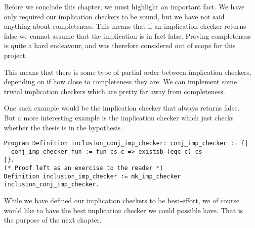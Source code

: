 Before we conclude this chapter, we must highlight an important fact. We have only
required our implication checkers to be sound, but we have not said anything about
completeness. This means that if an implication checker returns false we cannot 
assume that the implication is in fact false. Proving completeness is quite a hard
endeavour, and was therefore considered out of scope for this project.

This means that there is some type of partial order between implication checkers, 
depending on if how close to completeness they are. We can implement some trivial
implication checkers which are pretty far away from completeness. 

One such example would be the implication checker that always returns false. But a
more interesting example is the implication checker which just checks whether the
thesis is in the hypothesis.

\begin{verbatim}
Program Definition inclusion_conj_imp_checker: conj_imp_checker := {| 
  conj_imp_checker_fun := fun cs c => existsb (eqc c) cs
|}.
(* Proof left as an exercise to the reader *)
Definition inclusion_imp_checker := mk_imp_checker inclusion_conj_imp_checker.
\end{verbatim}

While we have defined our implication checkers to be best-effort, we of course would
like to have the best implication checker we could possible have. That is the 
purpose of the next chapter.